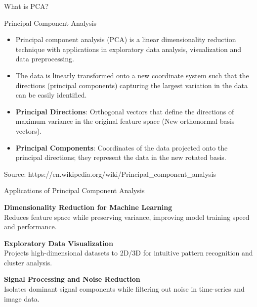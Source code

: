 \documentclass{beamer}
\begin{document}
\begin{frame}{What is PCA?}
    \begin{block}{Principal Component Analysis }
    \begin{itemize}
        \item Principal component analysis (PCA) is a linear dimensionality reduction technique with applications in exploratory data analysis, visualization and data preprocessing.
        
        \item The data is linearly transformed onto a new coordinate system such that the directions (principal components) capturing the largest variation in the data can be easily identified.
        
    \end{itemize}
        
    \end{block}

    \begin{itemize}
    \item \textbf{Principal Directions}: Orthogonal vectors that define the directions of maximum variance in the original feature space (New orthonormal basis vectors).
    \item \textbf{Principal Components}: Coordinates of the data projected onto the principal directions; they represent the data in the new rotated basis.
    \end{itemize}

    
    \footnotesize{Source: \scriptsize{https://en.wikipedia.org/wiki/Principal\_component\_analysis}}
\end{frame}

\begin{frame}{Applications of Principal Component Analysis}
    \vspace{0.5cm}
    
    \large\textbf{Dimensionality Reduction for Machine Learning}\\
    Reduces feature space while preserving variance, improving model training speed and performance.\\
    
    \vspace{0.5cm}
    
    \large\textbf{Exploratory Data Visualization}\\
    Projects high-dimensional datasets to 2D/3D for intuitive pattern recognition and cluster analysis.\\
    
    \vspace{0.5cm}
    
    \large\textbf{Signal Processing and Noise Reduction}\\
    Isolates dominant signal components while filtering out noise in time-series and image data.\\
    
\end{frame}
\end{document}
